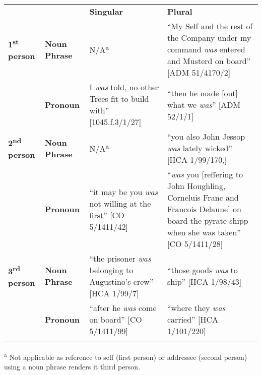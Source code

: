 \tabletail{}
\tablelasttail{}
\begin{tabularx}{\textwidth}{XXXX} &  & \textbf{Singular} & \textbf{Plural}\\

\lsptoprule
 \textbf{1\textsuperscript{st}} \textbf{person} & \textbf{Noun} \textbf{Phrase} & N/A\textsuperscript{a} & “My Self and the rest of the Company under my command \textit{was} entered and Musterd on board” [ADM 51/4170/2]\\
& \textbf{Pronoun} & I \textit{was} told, no other Trees fit to build with” [1045.f.3/1/27] & “then he made [out] what we \textit{was}” [ADM 52/1/1]\\
 \textbf{2\textsuperscript{nd}} \textbf{person} & \textbf{Noun} \textbf{Phrase} & N/A\textsuperscript{a} & “you also John Jessop \textit{was} lately wicked” [HCA 1/99/170,]\\
& \textbf{Pronoun} & “it may be you \textit{was} not willing at the first” [CO 5/1411/42] & “\textit{was} you [reffering to John Houghling, Corneluis Franc and Francois Delaune] on board the pyrate shipp when she was taken” [CO 5/1411/28] \\
 \textbf{3\textsuperscript{rd}} \textbf{person} & \textbf{Noun} \textbf{Phrase} & “the prisoner \textit{was} belonging to Augustino’s crew” [HCA 1/99/7] & “those goods \textit{was} to ship” [HCA 1/98/43] \\
& \textbf{Pronoun} & “after he \textit{was} come on board” [CO 5/1411/99] & “where they \textit{was} carried” [HCA 1/101/220]\\
\lspbottomrule
\end{tabularx}
\textsuperscript{a} Not applicable as reference to self (first person) or addressee (second person) using a noun phrase renders it third person. 

